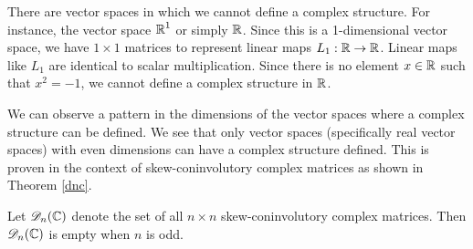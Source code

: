  There are vector spaces in which we cannot define a complex structure. For instance, the vector space $\operatorname{\mathbb{R}}^1$ or simply $\operatorname{\mathbb{R}}$. Since this is a 1-dimensional vector space, we have $1\times 1$ matrices to represent linear maps $L_1: \operatorname{\mathbb{R}} \rightarrow \operatorname{\mathbb{R}}$. Linear maps like $L_1$ are identical to scalar multiplication. Since there is no element $x \in \operatorname{\mathbb{R}}$ such that $x^2 = -1$, we cannot define a complex structure in $\operatorname{\mathbb{R}}$. 

 We can observe a pattern in the dimensions of the vector spaces where a complex structure can be defined. We see that only vector spaces (specifically real vector spaces) with even dimensions can have a complex structure defined. This is proven in the context of skew-coninvolutory complex matrices as shown in Theorem \ref{dnc}.

\begin{theorem} \label{dnc}
	\cite{stamaria} Let $\mathscr{D}_{n}(\operatorname{\mathbb{C}})$ denote the set of all $n \times n$ skew-coninvolutory complex matrices. Then $\mathscr{D}_{n}(\operatorname{\mathbb{C}})$ is empty when $n$ is odd.
\end{theorem}

